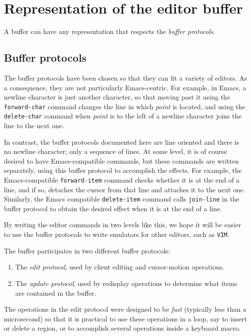 \chapter{Representation of the editor buffer}
\label{chap-internals-buffer}

A buffer can have any representation that respects the \emph{buffer
  protocols}.

\section{Buffer protocols}

The buffer protocols have been chosen so that they can fit a variety
of editors.  As a consequence, they are not particularly
Emacs-centric.  For example, in Emacs, a newline character is just
another character, so that moving past it using the
\texttt{forward-char} command changes the line in which \emph{point}
is located, and using the \texttt{delete-char} command when
\emph{point} is to the left of a newline character joins the line to
the next one.

In contrast, the buffer protocols documented here are line oriented
and there is no newline character; only a sequence of lines.  At some
level, it is of course desired to have Emacs-compatible commands, but
these commands are written separately, using this buffer protocol to
accomplish the effects.  For example, the Emacs-compatible
\texttt{forward-item} command checks whether it is at the end of a
line, and if so, detaches the cursor from that line and attaches it to
the next one.  Similarly, the Emacs compatible \texttt{delete-item}
command calls \texttt{join-line} in the buffer protocol to obtain the
desired effect when it is at the end of a line.

By writing the editor commands in two levels like this, we hope it
will be easier to use the buffer protocols to write emulators for
other editors, such as \texttt{VIM}.

The buffer participates in two different buffer protocols:

\begin{enumerate}
\item The \emph{edit protocol}, used by client editing and
  cursor-motion operations.
\item The \emph{update protocol}, used by redisplay operations to
  determine what items are contained in the buffer. 
\end{enumerate}

The operations in the edit protocol were designed to be \emph{fast}
(typically less than a microsecond)%
so that it is practical to use these operations in a loop, say to
insert or delete a region, or to accomplish several operations inside
a keyboard macro. 

